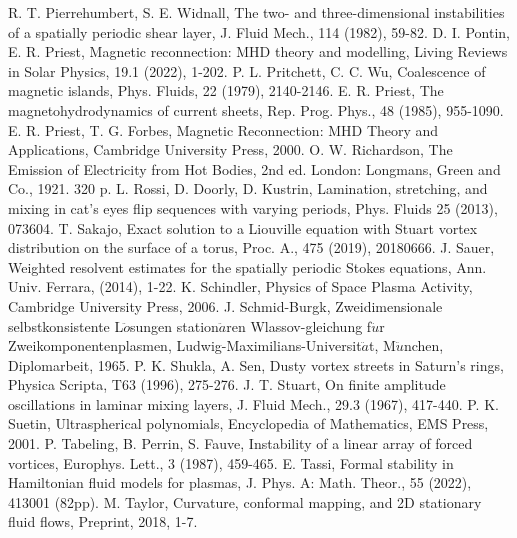 \documentclass[1 [leqno, 11pt]{amsart}
\numberwithin{equation}{section}
\begin{document}
\begin{CJK*}{GBK}{song}
\begin{thebibliography}{99}

R. T. Pierrehumbert, S. E. Widnall, The two- and three-dimensional instabilities of a spatially periodic shear layer, J. Fluid Mech., 114 (1982), 59-82.
  D. I. Pontin, E. R. Priest,  Magnetic reconnection: MHD theory and modelling, Living Reviews in Solar Physics,  19.1 (2022), 1-202.
 P. L. Pritchett, C. C. Wu, Coalescence of magnetic islands, Phys. Fluids,  22 (1979),  2140-2146.
 E. R. Priest, The magnetohydrodynamics of current sheets, Rep. Prog. Phys., 48 (1985), 955-1090.
  E. R. Priest, T. G. Forbes, Magnetic Reconnection: MHD Theory and Applications,  Cambridge University Press, 2000.
O. W. Richardson,  The Emission of Electricity from Hot Bodies, 2nd ed. London: Longmans,
Green and Co., 1921. 320 p.
L. Rossi, D. Doorly, D. Kustrin,
Lamination, stretching, and mixing in cat's eyes flip sequences with varying periods, Phys. Fluids 25 (2013), 073604.
T. Sakajo,   Exact solution to a Liouville equation with Stuart vortex distribution on the
surface of a torus, Proc. A., 475 (2019), 20180666.
 J. Sauer, Weighted resolvent estimates for the spatially periodic Stokes equations, Ann.
Univ. Ferrara, (2014), 1-22.
 K. Schindler, Physics of Space Plasma Activity, Cambridge University Press, 2006.
J. Schmid-Burgk, Zweidimensionale selbstkonsistente L$\ddot{o}$sungen station$\ddot{a}$ren Wlassov-gleichung f$\ddot{u}$r Zweikomponentenplasmen, Ludwig-Maximilians-Universit$\ddot{a}$t, M$\ddot{u}$nchen, Diplomarbeit, 1965.
P. K. Shukla, A. Sen, Dusty vortex streets in Saturn's rings, Physica Scripta, T63 (1996), 275-276.
J. T. Stuart, On finite amplitude oscillations in laminar mixing layers,  J. Fluid Mech., 29.3 (1967),  417-440.
 P. K. Suetin,   Ultraspherical polynomials, Encyclopedia of Mathematics, EMS Press, 2001.
P. Tabeling, B. Perrin, S. Fauve, Instability of a linear array of forced vortices, Europhys. Lett., 3 (1987),  459-465.
 E. Tassi, Formal stability in Hamiltonian fluid models for
plasmas, J. Phys. A: Math. Theor., 55 (2022), 413001 (82pp).
 M. Taylor, Curvature, conformal mapping, and 2D stationary fluid flows, Preprint, 2018, 1-7.


\end{thebibliography}
\end{CJK*}
\end{document}
